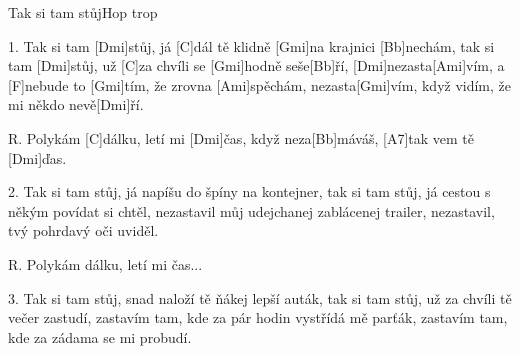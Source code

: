 \begin{song}{Tak si tam stůj}{Hop trop}

\begin{xverse}{1. }
Tak si tam [Dmi]stůj, já [C]dál tě klidně [Gmi]na krajnici [Bb]nechám,
tak si tam [Dmi]stůj, už [C]za chvíli se [Gmi]hodně seše[Bb]{}ří,
[Dmi]nezasta[Ami]vím, a [F]nebude to [Gmi]tím, že zrovna [Ami]spěchám,
nezasta[Gmi]vím, když vidím, že mi někdo nevě[Dmi]{}ří.
\end{xverse}

\begin{xverse}{R. }
Polykám [C]dálku, letí mi [Dmi]{}čas,
když neza[Bb]máváš, [A7]tak vem tě [Dmi]{}ďas.
\end{xverse}


\begin{xverse}{2. }
Tak si tam stůj, já napíšu do špíny na kontejner,
tak si tam stůj, já cestou s někým povídat si chtěl,
nezastavil můj udejchanej zablácenej trailer,
nezastavil, tvý pohrdavý oči uviděl.
\end{xverse}


\begin{xverse}{R. }
Polykám dálku, letí mi čas...
\end{xverse}


\begin{xverse}{3. }
Tak si tam stůj, snad naloží tě ňákej lepší auták,
tak si tam stůj, už za chvíli tě večer zastudí,
zastavím tam, kde za pár hodin vystřídá mě parťák,
zastavím tam, kde za zádama se mi probudí.
\end{xverse}

\end{song}


